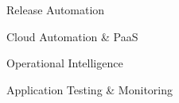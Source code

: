 \sectionspace


\begin{minipage}[t]{0.33\textwidth} %


\begin{tightitemize}
\item Release Automation
\item Cloud Automation \& PaaS
\item Operational Intelligence
\item Application Testing \& Monitoring
\end{tightitemize}

\end{minipage} %
\hfill
